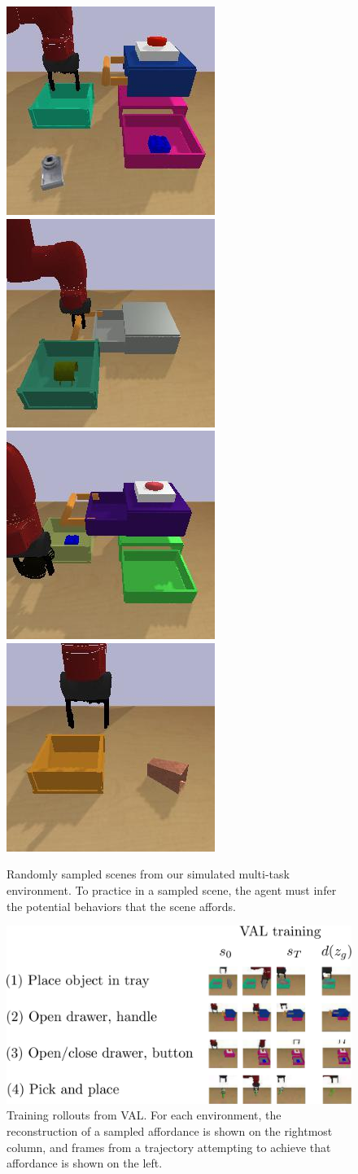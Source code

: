 \begin{figure}[t]
    \center
    \includegraphics[height=0.24\linewidth]{val/imgs/views/simb_view.jpeg}
    \includegraphics[width=0.24\linewidth]{val/imgs/views/sima_view1.jpeg}
    \includegraphics[height=0.24\linewidth]{val/imgs/views/sima_view2.jpeg}
    \includegraphics[width=0.24\linewidth]{val/imgs/views/sima_view3.jpeg}
    \caption{Randomly sampled scenes from our simulated multi-task environment. To practice in a sampled scene, the agent must infer the potential behaviors that the scene affords.}
    \label{fig:simenvs}
\end{figure}

\begin{figure}[t]
    \center
    \includegraphics[width=0.99\linewidth]{val/imgs/fig_rollouts_sim-crop-compressed.pdf}
    \caption{Training rollouts from VAL. For each environment, the reconstruction of a sampled affordance is shown on the rightmost column, and frames from a trajectory attempting to achieve that affordance is shown on the left.}
    \label{fig:simenvs}
\end{figure}

